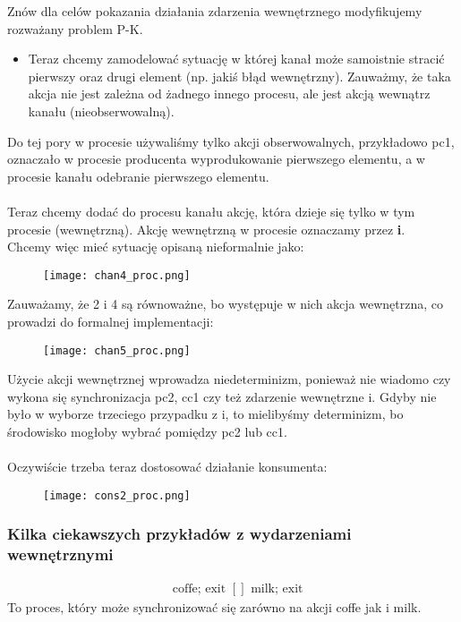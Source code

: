 \documentclass[a4paper,15pt]{article}
\newcommand{\example}[2]{
    \begin{tcolorbox}[colback=blue!5!white,colframe=blue,title={Przykład #1}]
        #2
    \end{tcolorbox}
}
\begin{document}
Znów dla celów pokazania działania zdarzenia wewnętrznego modyfikujemy rozważany problem P-K. 
\begin{itemize}
\item  Teraz chcemy zamodelować sytuację w której kanał może samoistnie stracić pierwszy oraz drugi element (np. jakiś błąd wewnętrzny). Zauważmy, że taka akcja nie jest zależna od żadnego innego procesu, ale jest akcją wewnątrz kanału (nieobserwowalną).
\end{itemize}

Do tej pory w procesie używaliśmy tylko akcji obserwowalnych, przykładowo pc1, oznaczało w procesie producenta wyprodukowanie pierwszego elementu, a w procesie kanału odebranie pierwszego elementu. \\ \\
Teraz chcemy dodać do procesu kanału akcję, która dzieje się tylko w tym procesie (wewnętrzną). Akcję wewnętrzną w procesie oznaczamy przez \textbf{i}. \\
Chcemy więc mieć sytuację opisaną nieformalnie jako:


\begin{figure}[H]
\centerline{\texttt{[image: chan4\_proc.png]}}
\label{fig:chan4_proc}
\end{figure}

Zauważamy, że 2 i 4 są równoważne, bo występuje w nich akcja wewnętrzna, co prowadzi do formalnej implementacji:

\begin{figure}[H]
\centerline{\texttt{[image: chan5\_proc.png]}}
\label{fig:chan5_proc}
\end{figure}

Użycie akcji wewnętrznej wprowadza niedeterminizm, ponieważ nie wiadomo czy wykona się synchronizacja pc2, cc1 czy też zdarzenie wewnętrzne i. Gdyby nie było w wyborze trzeciego przypadku z i, to mielibyśmy determinizm, bo środowisko mogłoby wybrać pomiędzy pc2 lub cc1.  \\ \\
Oczywiście trzeba teraz dostosować działanie konsumenta:

\begin{figure}[H]
\centerline{\texttt{[image: cons2\_proc.png]}}
\label{fig:cons2_proc}
\end{figure}

\subsubsection{Kilka ciekawszych przykładów z wydarzeniami wewnętrznymi}
\example{}{
\begin{align*}
& \text{coffe; exit } [] \text{ milk; exit}
\end{align*}
To proces, który może synchronizować się zarówno na akcji coffe jak i milk.
}
\end{document}
